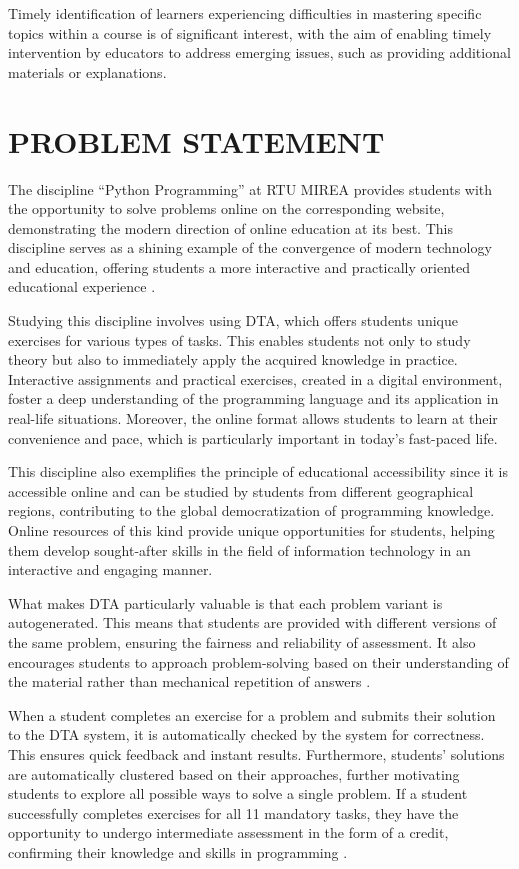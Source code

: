 \documentclass{article}
\begin{document}
\begin{multicols}{2}
\begin{justify}
      Timely identification of learners experiencing difficulties in mastering specific topics within a course is of significant interest, with the aim of enabling timely intervention by educators to address emerging issues, such as providing additional materials or explanations.
      
      \section{PROBLEM STATEMENT}
      The discipline “Python Programming” at RTU MIREA provides students with the opportunity to solve problems online on the corresponding website, demonstrating the modern direction of online education at its best. This discipline serves as a shining example of the convergence of modern technology and education, offering students a more interactive and practically oriented educational experience \cite{8}.

      Studying this discipline involves using DTA, which offers students unique exercises for various types of tasks. This enables students not only to study theory but also to immediately apply the acquired knowledge in practice. Interactive assignments and practical exercises, created in a digital environment, foster a deep understanding of the programming language and its application in real-life situations. Moreover, the online format allows students to learn at their convenience and pace, which is particularly important in today's fast-paced life.

      This discipline also exemplifies the principle of educational accessibility since it is accessible online and can be studied by students from different geographical regions, contributing to the global democratization of programming knowledge. Online resources of this kind provide unique opportunities for students, helping them develop sought-after skills in the field of information technology in an interactive and engaging manner.

      What makes DTA particularly valuable is that each problem variant is autogenerated. This means that students are provided with different versions of the same problem, ensuring the fairness and reliability of assessment. It also encourages students to approach problem-solving based on their understanding of the material rather than mechanical repetition of answers \cite{9}.

      When a student completes an exercise for a problem and submits their solution to the DTA system, it is automatically checked by the system for correctness. This ensures quick feedback and instant results. Furthermore, students' solutions are automatically clustered based on their approaches, further motivating students to explore all possible ways to solve a single problem. If a student successfully completes exercises for all 11 mandatory tasks, they have the opportunity to undergo intermediate assessment in the form of a credit, confirming their knowledge and skills in programming \cite{10}.


\end{justify}
\end{multicols}
\end{document}

